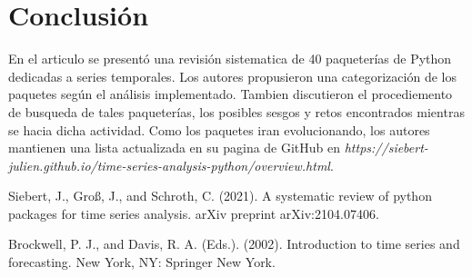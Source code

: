 \documentclass[a4paper, 11pt]{article}
\begin{document}
\section{Conclusión}

En el articulo se presentó una revisión sistematica de 40 paqueterías de Python dedicadas a series temporales. Los autores propusieron una categorización de los paquetes según el análisis implementado. Tambien discutieron el procediemento de busqueda de tales paqueterías, los posibles sesgos y retos encontrados mientras se hacia dicha actividad. Como los paquetes iran evolucionando, los autores mantienen una lista actualizada en su pagina de GitHub en \textit{https://siebert-julien.github.io/time-series-analysis-python/overview.html}.




\begin{thebibliography}{9}

  Siebert, J., Groß, J., and Schroth, C. (2021). A systematic review of python packages for time series analysis. arXiv preprint arXiv:2104.07406.

  Brockwell, P. J., and Davis, R. A. (Eds.). (2002). Introduction to time series and forecasting. New York, NY: Springer New York.
  
  
  \end{thebibliography}
\end{document}
